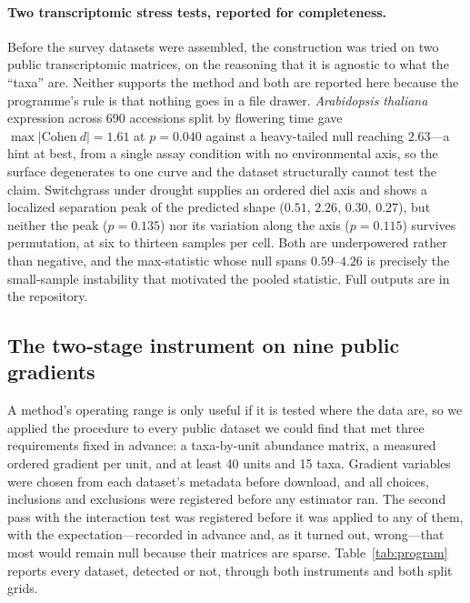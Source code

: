 \documentclass[review,12pt,authoryear]{elsarticle}
\theoremstyle{remark}
\begin{document}
\paragraph{Two transcriptomic stress tests, reported for completeness.}
Before the survey datasets were assembled, the construction was tried on two
public transcriptomic matrices, on the reasoning that it is agnostic to what
the ``taxa'' are. Neither supports the method and both are reported here
because the programme's rule is that nothing goes in a file drawer.
\emph{Arabidopsis thaliana} expression across 690 accessions
\citep{kawakatsu2016} split by flowering time gave
$\max|\mathrm{Cohen}\ d| = 1.61$ at $p = 0.040$ against a heavy-tailed null
reaching $2.63$---a hint at best, from a single assay condition with no
environmental axis, so the surface degenerates to one curve and the dataset
structurally cannot test the claim. Switchgrass under drought
\citep{meyer2014switchgrass} supplies an ordered diel axis and shows a
localized separation peak of the predicted shape ($0.51$, $2.26$, $0.30$,
$0.27$), but neither the peak ($p = 0.135$) nor its variation along the axis
($p = 0.115$) survives permutation, at six to thirteen samples per cell.
Both are underpowered rather than negative, and the max-statistic whose null
spans $0.59$--$4.26$ is precisely the small-sample instability that motivated
the pooled statistic. Full outputs are in the repository.

\subsection{The two-stage instrument on nine public gradients}
\label{sec:program}

A method's operating range is only useful if it is tested where the data
are, so we applied the procedure to every public dataset we could find that
met three requirements fixed in advance: a taxa-by-unit abundance matrix, a
measured ordered gradient per unit, and at least 40 units and 15 taxa.
Gradient variables were chosen from each dataset's metadata before download,
and all choices, inclusions and exclusions were registered before any
estimator ran. The second pass with the interaction test was registered
before it was applied to any of them, with the expectation---recorded in
advance and, as it turned out, wrong---that most would remain null because
their matrices are sparse. Table~\ref{tab:program} reports every dataset,
detected or not, through both instruments and both split grids.
\end{document}
